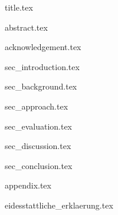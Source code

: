 \documentclass[12pt,a4paper]{article}
\begin{document}
{title.tex}

\clearpage
{abstract.tex}


\clearpage
{acknowledgement.tex}


\clearpage
\tableofcontents


\clearpage
\listoffigures


\clearpage
\listoftables


\newpage
{}
{sec_introduction.tex}


\clearpage
{sec_background.tex}


\clearpage
{sec_approach.tex}


\clearpage
{sec_evaluation.tex}


\clearpage
{sec_discussion.tex}


\clearpage
{sec_conclusion.tex}


\clearpage
{appendix.tex}


\clearpage

{}


\clearpage
{eidesstattliche_erklaerung.tex}
\end{document}
